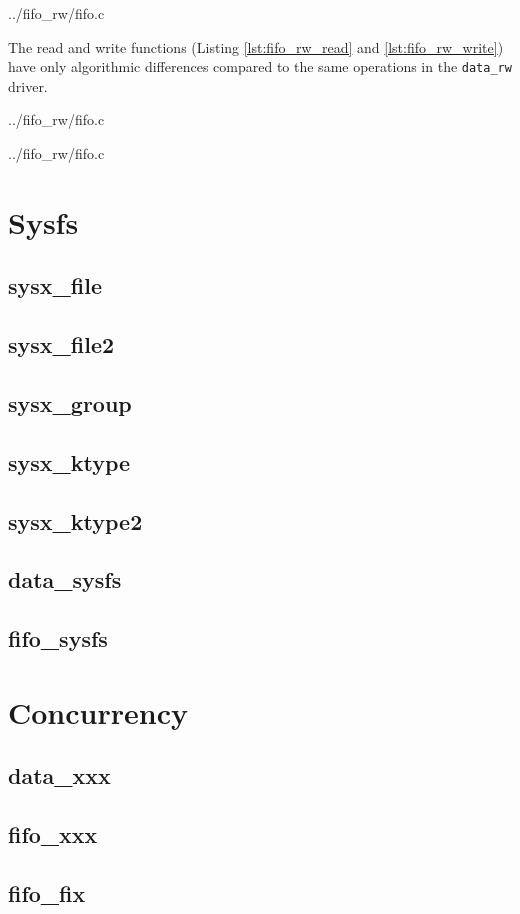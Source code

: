 \documentclass{article}
\begin{document}

	{../fifo_rw/fifo.c}

The read and write functions
(Listing \ref{lst:fifo_rw_read} and \ref{lst:fifo_rw_write})
have only algorithmic differences compared to the same operations in the
\verb+data_rw+ driver.


	{../fifo_rw/fifo.c}


	{../fifo_rw/fifo.c}

\section{Sysfs}

\subsection{sysx\_file}
\subsection{sysx\_file2}
\subsection{sysx\_group}
\subsection{sysx\_ktype}
\subsection{sysx\_ktype2}
\subsection{data\_sysfs}
\subsection{fifo\_sysfs}

\section{Concurrency}
\subsection{data\_xxx}
\subsection{fifo\_xxx}
\subsection{fifo\_fix}

\pagebreak
\printbibliography

\end{document}

